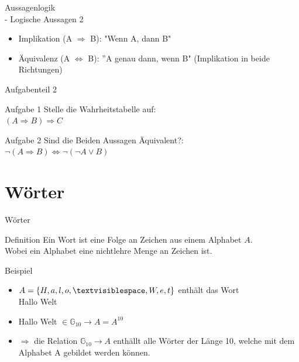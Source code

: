 \documentclass[18pt]{beamer}
\begin{document}
	\begin{frame}{Aussagenlogik\\ - Logische Aussagen 2}
		\begin{itemize}
			\item Implikation (A $\Rightarrow$ B): "Wenn A, dann B"
			\pause
			\item \"Aquivalenz (A $\Leftrightarrow$ B): ''A genau dann, wenn B" (Implikation in beide Richtungen)
		\end{itemize}
	\end{frame}


	\begin{frame}{Aufgabenteil 2}
		\begin{block}{Aufgabe 1}
			Stelle die Wahrheitstabelle auf:\\
			$(A \Rightarrow B) \Rightarrow C$
		\end{block}
		
		\begin{block}{Aufgabe 2}
			Sind die Beiden Aussagen \"Aquivalent?:\\
			$\neg (A \Rightarrow B) \Leftrightarrow \neg (\neg A \lor B)$
		\end{block}
	\end{frame}
	
	
	\section{W\"orter}
	\begin{frame} {W\"orter}
		\begin{block} {Definition}
			Ein Wort ist eine Folge an Zeichen aus einem Alphabet $A$.\\
			Wobei ein Alphabet eine nichtlehre Menge an Zeichen ist.
		\end{block}
		
		\pause
	
		\begin{exampleblock} {Beispiel}
			\begin{itemize}
				\item $A = \left\{H, a, l, o, \textvisiblespace, W, e, t\right\}$  enth\"alt das Wort\\
            Hallo Welt
            \pause
            \item Hallo Welt $\in \mathbb{G}_{10} \rightarrow A = A^{10}$
            \pause
            \item $\Rightarrow$ die Relation $\mathbb{G}_{10} \rightarrow A$ enth\"allt alle W\"orter der L\"ange 10, welche mit dem Alphabet A gebildet werden können. 
			\end{itemize}
	
		\end{exampleblock}
	\end{frame}
	
\end{document}
